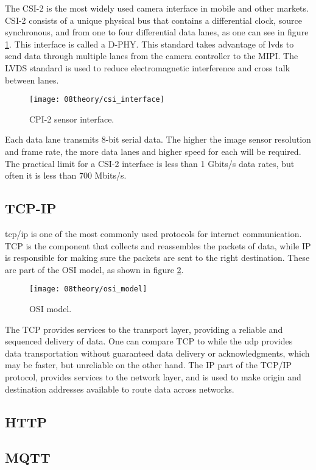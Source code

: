 The CSI-2 is the most widely used camera interface in mobile and other markets. CSI-2 consists of a unique physical bus that contains a differential clock, source synchronous, and from one to four differential data lanes, as one can see in figure \ref{fig:csi_interface}. This interface is called a D-PHY. This standard takes advantage of \ac{lvds} to send data through multiple lanes from the camera controller to the MIPI. The LVDS standard is used to reduce electromagnetic interference and cross talk between lanes.

\begin{figure}[H]
	\centering
	\texttt{[image: 08theory/csi\_interface]}
	\caption{CPI-2 sensor interface.}
	\label{fig:csi_interface}
\end{figure}

Each data lane transmits 8-bit serial data. The higher the image sensor resolution and frame rate, the more data lanes and higher speed for each will be required. The practical limit for a CSI-2 interface is less than 1 Gbits/s data rates, but often it is less than 700 Mbits/s. \cite{csi_interface}

\clearpage
\subsection{TCP-IP}
\ac{tcp}/\ac{ip} is one of the most commonly used protocols for internet communication. TCP is the component that collects and reassembles the packets of data, while IP is responsible for making sure the packets are sent to the right destination. These are part of the OSI model, as shown in figure \ref{fig:osi_model}.

\begin{figure}[H]
	\centering
	\texttt{[image: 08theory/osi\_model]}
	\caption{OSI model.}
	\label{fig:osi_model}
\end{figure}

The TCP provides services to the transport layer, providing a reliable and sequenced delivery of data. One can compare TCP to while the \ac{udp} provides data transportation without guaranteed data delivery or acknowledgments, which may be faster, but unreliable on the other hand. The IP part of the TCP/IP protocol, provides services to the network layer, and is used to make origin and destination addresses available to route data across networks.

\clearpage
\subsection{HTTP}
\subsection{MQTT}